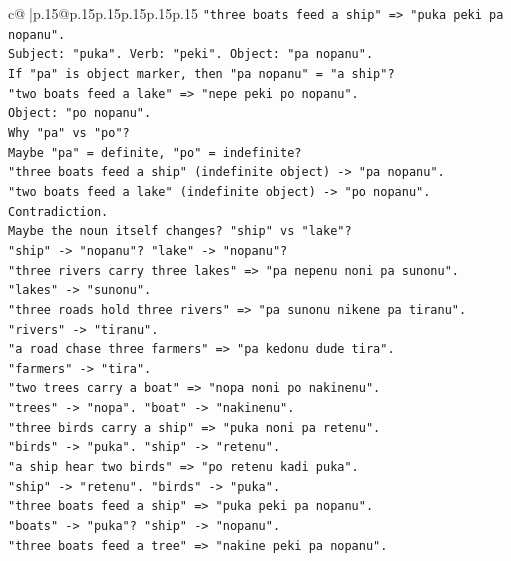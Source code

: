 \documentclass{article}
\begin{document}
{\begin{supertabular}{c@{$\;$}|p{.15\linewidth}@{}p{.15\linewidth}p{.15\linewidth}p{.15\linewidth}p{.15\linewidth}p{.15\linewidth}}
{{{\texttt{"three boats feed a ship" => "puka peki pa nopanu".} \\
\texttt{Subject: "puka". Verb: "peki". Object: "pa nopanu".} \\
\texttt{If "pa" is object marker, then "pa nopanu" = "a ship"?} \\
\texttt{"two boats feed a lake" => "nepe peki po nopanu".} \\
\texttt{Object: "po nopanu".} \\
\texttt{Why "pa" vs "po"?} \\
\texttt{Maybe "pa" = definite, "po" = indefinite?} \\
\texttt{"three boats feed a ship" (indefinite object) {-}> "pa nopanu".} \\
\texttt{"two boats feed a lake" (indefinite object) {-}> "po nopanu".} \\
\texttt{Contradiction.} \\
\texttt{Maybe the noun itself changes? "ship" vs "lake"?} \\
\texttt{"ship" {-}> "nopanu"? "lake" {-}> "nopanu"?} \\
\texttt{"three rivers carry three lakes" => "pa nepenu noni pa sunonu".} \\
\texttt{"lakes" {-}> "sunonu".} \\
\texttt{"three roads hold three rivers" => "pa sunonu nikene pa tiranu".} \\
\texttt{"rivers" {-}> "tiranu".} \\
\texttt{"a road chase three farmers" => "pa kedonu dude tira".} \\
\texttt{"farmers" {-}> "tira".} \\
\texttt{"two trees carry a boat" => "nopa noni po nakinenu".} \\
\texttt{"trees" {-}> "nopa". "boat" {-}> "nakinenu".} \\
\texttt{"three birds carry a ship" => "puka noni pa retenu".} \\
\texttt{"birds" {-}> "puka". "ship" {-}> "retenu".} \\
\texttt{"a ship hear two birds" => "po retenu kadi puka".} \\
\texttt{"ship" {-}> "retenu". "birds" {-}> "puka".} \\
\texttt{"three boats feed a ship" => "puka peki pa nopanu".} \\
\texttt{"boats" {-}> "puka"? "ship" {-}> "nopanu".} \\
\texttt{"three boats feed a tree" => "nakine peki pa nopanu".} \\
}}}
\end{supertabular}}
\end{document}
